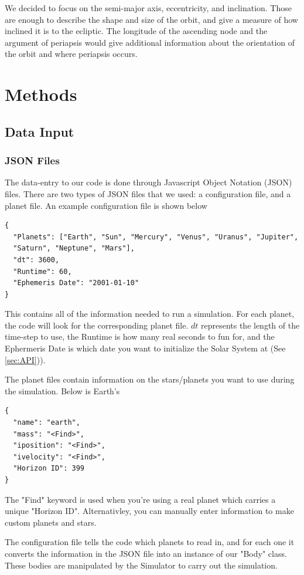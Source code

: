\documentclass[a4paper,12pt]{article} %
\numberwithin{equation}{section} %
\numberwithin{figure}{section} %
\begin{document}
We decided to focus on the semi-major axis, eccentricity, and inclination. Those are enough to describe the shape and size of the orbit, and give a measure of how inclined it is to the ecliptic. The longitude of the ascending node and the argument of periapsis would give additional information about the orientation of the orbit and where periapsis occurs.

\section{Methods}

\subsection{Data Input}

\subsubsection{JSON Files}

The data-entry to our code is done through Javascript Object Notation (JSON) files. There are two types of JSON files that we used: a configuration file, and a planet file. An example configuration file is shown below

\begin{lstlisting}
{
  "Planets": ["Earth", "Sun", "Mercury", "Venus", "Uranus", "Jupiter",
  "Saturn", "Neptune", "Mars"],
  "dt": 3600,
  "Runtime": 60,
  "Ephemeris Date": "2001-01-10"
}
\end{lstlisting}

This contains all of the information needed to run a simulation. For each planet, the code will look for the corresponding planet file. $dt$ represents the length of the time-step to use, the Runtime is how many real seconds to fun for, and the Ephermeris Date is which date you want to initialize the Solar System at (See \autoref{sec:API})). \par
The planet files contain information on the stars/planets you want to use during the simulation. Below is Earth's

\begin{lstlisting}
{
  "name": "earth",
  "mass": "<Find>",
  "iposition": "<Find>",
  "ivelocity": "<Find>",
  "Horizon ID": 399
}
\end{lstlisting}

The "\<Find\>" keyword is used when you're using a real planet which carries a unique "Horizon ID". Alternativley, you can manually enter information to make custom planets and stars. \par
The configuration file tells the code which planets to read in, and for each one it converts the information in the JSON file into an instance of our "Body" class. These bodies are manipulated by the Simulator to carry out the simulation.
\end{document}
